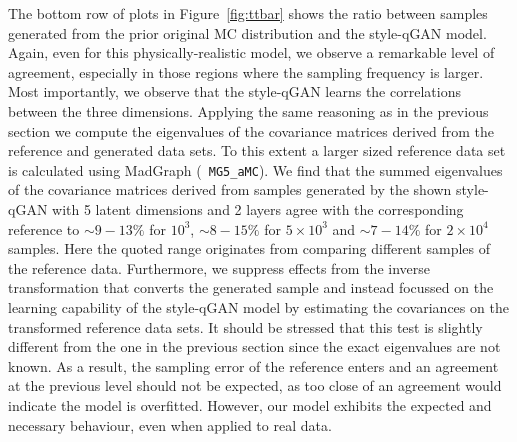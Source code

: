 \documentclass[twocolumn,preprintnumbers,superscriptaddress]{revtex4-2}
\begin{document}
The bottom row of plots in Figure~\ref{fig:ttbar} shows the ratio between
samples generated from the prior original MC distribution and the style-qGAN
model. Again, even for this physically-realistic model, we observe a remarkable level of agreement, especially in those regions where the sampling frequency is larger. Most importantly, we observe that the style-qGAN learns
the correlations between the three dimensions. 
%
Applying the same reasoning as in the previous section we compute the eigenvalues of the covariance matrices derived from the reference and generated data sets. To this extent a larger sized reference data set is calculated using MadGraph ({\tt
MG5\_aMC}). We find that the summed eigenvalues of the covariance matrices derived from samples generated by the shown style-qGAN with 5 latent dimensions and 2 layers agree with the corresponding reference to $\sim 9-13\%$ for $10^3$, $\sim 8-15\%$ for $5\times10^3$ and $\sim 7-14\%$ for $2\times10^4$ samples. Here the quoted range originates from comparing different samples of the reference data. Furthermore, we suppress effects from the inverse transformation that converts the generated sample and instead focussed on the learning capability of the style-qGAN model by estimating the covariances on the transformed reference data sets.
%
It should be stressed that this test is slightly different from the one in the previous section since the exact eigenvalues are not known. As a result, the sampling error of the reference enters and an agreement at the previous level should not be expected, as too close of an agreement would indicate the model is overfitted.  However, our model exhibits the expected and necessary behaviour, even when applied to real data. 
 
\end{document}
